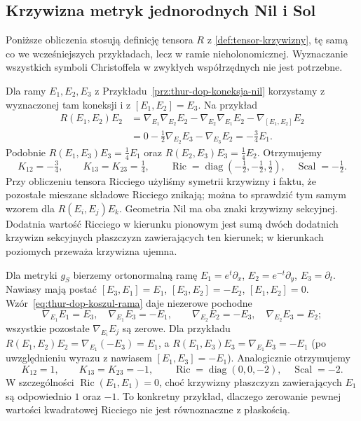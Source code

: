 \subsection*{Krzywizna metryk jednorodnych Nil i Sol}
\label{sec:thur-dop-krzywizna-nil-sol}
Poniższe obliczenia stosują definicję tensora $R$ z
\ref{def:tensor-krzywizny}, tę samą co we wcześniejszych
przykładach, lecz w ramie nieholonomicznej. Wyznaczanie
wszystkich symboli Christoffela w zwykłych współrzędnych
nie jest potrzebne.

\begin{przyklad}
\label{prz:thur-dop-krzywizna-nil}
Dla ramy $E_1,E_2,E_3$ z Przykładu~\ref{prz:thur-dop-koneksja-nil}
korzystamy z wyznaczonej tam koneksji i z $[E_1,E_2]=E_3$.
Na przykład
\[
\begin{aligned}
 R(E_1,E_2)E_2
 &=\nabla_{E_1}\nabla_{E_2}E_2
   -\nabla_{E_2}\nabla_{E_1}E_2
   -\nabla_{[E_1,E_2]}E_2\\
 &=0-\tfrac12\nabla_{E_2}E_3-\nabla_{E_3}E_2
 =-\tfrac34E_1.
\end{aligned}
\]
Podobnie $R(E_1,E_3)E_3=\tfrac14 E_1$ oraz
$R(E_2,E_3)E_3=\tfrac14 E_2$. Otrzymujemy
\[
 K_{12}=-\tfrac34,\qquad K_{13}=K_{23}=\tfrac14,
 \qquad \operatorname{Ric}
 =\operatorname{diag}(-\tfrac12,-\tfrac12,\tfrac12),
 \quad \operatorname{Scal}=-\tfrac12.
\]
Przy obliczeniu tensora Ricciego użyliśmy symetrii krzywizny i faktu,
że pozostałe mieszane składowe Ricciego znikają;
można to sprawdzić tym samym wzorem dla $R(E_i,E_j)E_k$.
Geometria Nil ma oba znaki krzywizny sekcyjnej. Dodatnia
wartość Ricciego w kierunku pionowym jest sumą dwóch
dodatnich krzywizn sekcyjnych płaszczyzn zawierających ten kierunek;
w kierunkach poziomych przeważa krzywizna ujemna.
\end{przyklad}

\begin{przyklad}
\label{prz:thur-dop-krzywizna-sol}
Dla metryki $g_S$ bierzemy ortonormalną ramę
$E_1=e^t\partial_x$, $E_2=e^{-t}\partial_y$,
$E_3=\partial_t$. Nawiasy mają postać
$[E_3,E_1]=E_1$, $[E_3,E_2]=-E_2$,
$[E_1,E_2]=0$. Wzór~\eqref{eq:thur-dop-koszul-rama}
daje niezerowe pochodne
\[
\nabla_{E_1}E_1=E_3,\quad \nabla_{E_1}E_3=-E_1,
\qquad \nabla_{E_2}E_2=-E_3,\quad
\nabla_{E_2}E_3=E_2;
\]
wszystkie pozostałe $\nabla_{E_i}E_j$ są zerowe.
Dla przykładu
$R(E_1,E_2)E_2=\nabla_{E_1}(-E_3)=E_1$,
a $R(E_1,E_3)E_3=\nabla_{E_1}E_3=-E_1$
(po uwzględnieniu wyrazu z nawiasem $[E_1,E_3]=-E_1$).
Analogicznie otrzymujemy
\[
 K_{12}=1,\qquad K_{13}=K_{23}=-1,
 \qquad \operatorname{Ric}=\operatorname{diag}(0,0,-2),
 \quad \operatorname{Scal}=-2.
\]
W szczególności $\operatorname{Ric}(E_1,E_1)=0$,
choć krzywizny płaszczyzn zawierających $E_1$
są odpowiednio $1$ oraz $-1$. To konkretny
przykład, dlaczego zerowanie pewnej wartości kwadratowej
Ricciego nie jest równoznaczne z płaskością.
\end{przyklad}
